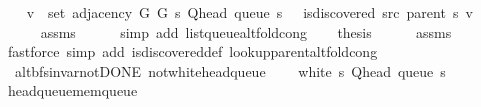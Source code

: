 \begin{isabellebody}
\ \ \isamarkupfalse%
\ {\isachardoublequoteopen}v\ {\isasymin}\ set\ {\isacharparenleft}{\kern0pt}adjacency\ G{}\ G{}\ s\ {\isacharparenleft}{\kern0pt}Q{\isacharunderscore}{\kern0pt}head\ {\isacharparenleft}{\kern0pt}queue\ s{\isacharparenright}{\kern0pt}{\isacharparenright}{\kern0pt}{\isacharparenright}{\kern0pt}\ {\isasymand}\ {\isasymnot}\ is{\isacharunderscore}{\kern0pt}discovered\ src\ {\isacharparenleft}{\kern0pt}parent\ s{\isacharparenright}{\kern0pt}\ v{\isachardoublequoteclose}\isanewline
\ \ \ \ \isamarkupfalse%
\ assms\isanewline
\ \ \ \ \isamarkupfalse%
\ {\isacharparenleft}{\kern0pt}simp\ add{\isacharcolon}{\kern0pt}\ list{\isacharunderscore}{\kern0pt}queue{\isacharunderscore}{\kern0pt}alt{\isacharunderscore}{\kern0pt}fold{\isacharunderscore}{\kern0pt}cong{\isacharparenright}{\kern0pt}\isanewline
\ \ \isamarkupfalse%
\ {\isacharquery}{\kern0pt}thesis\isanewline
\ \ \ \ \isamarkupfalse%
\ assms\isanewline
\ \ \ \ \isamarkupfalse%
\ {\isacharparenleft}{\kern0pt}fastforce\ simp\ add{\isacharcolon}{\kern0pt}\ is{\isacharunderscore}{\kern0pt}discovered{\isacharunderscore}{\kern0pt}def\ lookup{\isacharunderscore}{\kern0pt}parent{\isacharunderscore}{\kern0pt}alt{\isacharunderscore}{\kern0pt}fold{\isacharunderscore}{\kern0pt}cong{\isacharparenright}{\kern0pt}\isanewline
{}\isamarkupfalse%
%
\endisatagproof
{\isafoldproof}%
%
\isadelimproof
\isanewline
%
\endisadelimproof
%
\isadeliminvisible
\isanewline
%
\endisadeliminvisible
%
\isataginvisible
{}\isamarkupfalse%
\ {\isacharparenleft}{\kern0pt}\ alt{\isacharunderscore}{\kern0pt}bfs{\isacharunderscore}{\kern0pt}invar{\isacharunderscore}{\kern0pt}not{\isacharunderscore}{\kern0pt}DONE{\isacharparenright}{\kern0pt}\ not{\isacharunderscore}{\kern0pt}white{\isacharunderscore}{\kern0pt}head{\isacharunderscore}{\kern0pt}queue{\isacharcolon}{\kern0pt}\isanewline
\ \ \ {\isachardoublequoteopen}{\isasymnot}\ white\ s\ {\isacharparenleft}{\kern0pt}Q{\isacharunderscore}{\kern0pt}head\ {\isacharparenleft}{\kern0pt}queue\ s{\isacharparenright}{\kern0pt}{\isacharparenright}{\kern0pt}{\isachardoublequoteclose}%
\endisataginvisible
{\isafoldinvisible}%
%
\isadeliminvisible
\isanewline
%
\endisadeliminvisible
%
\isadelimproof
\ \ %
\endisadelimproof
%
\isatagproof
{}\isamarkupfalse%
\ head{\isacharunderscore}{\kern0pt}queue{\isacharunderscore}{\kern0pt}mem{\isacharunderscore}{\kern0pt}queue\isanewline
\ \ \isamarkupfalse%

\end{isabellebody}
